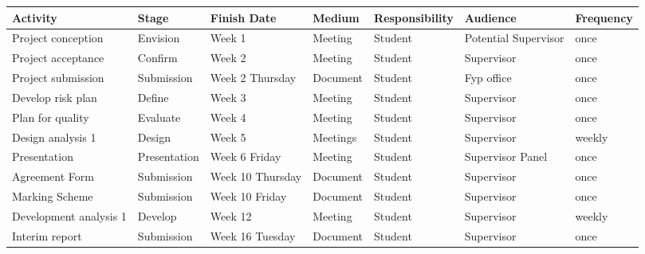 	\begin{center}
	
		\begin{tabular}{ | >{\scriptsize}p{35mm} | >{\scriptsize}p{15mm} | >{\scriptsize}p{25mm} | >{\scriptsize}p{15mm} | >{\scriptsize}p{25mm} | >{\scriptsize}p{15mm} | >{\scriptsize}p{15mm} |}
			\hline

			\textbf{Activity} 		& \textbf{Stage} 	& \textbf{Finish Date} 	& \textbf{Medium} 	& \textbf{Responsibility} 	& \textbf{Audience} 		& \textbf{Frequency} 	\\ \hline
			Project conception 		& Envision 			& Week 1 				& Meeting		 	& Student 					& Potential Supervisor	 	& once 					\\ \hline
			\rowcolor[gray]{.98}
			Project acceptance 		& Confirm 			& Week 2 				& Meeting 			& Student 					& Supervisor 				& once 					\\ \hline
			Project submission 		& Submission 		& Week 2 Thursday 		& Document 			& Student 					& Fyp office 				& once 					\\ \hline
			\rowcolor[gray]{.98}
			Develop risk plan 		& Define 			& Week 3 				& Meeting 			& Student 					& Supervisor 				& once 					\\ \hline
			Plan for quality 		& Evaluate 			& Week 4 				& Meeting 			& Student 					& Supervisor 				& once 					\\ \hline
			\rowcolor[gray]{.98}
			Design analysis 1 		& Design 			& Week 5 				& Meetings 			& Student 					& Supervisor 				& weekly 				\\ \hline
			Presentation 			& Presentation 		& Week 6 Friday			& Meeting 			& Student 					& Supervisor Panel 			& once 					\\ \hline
			\rowcolor[gray]{.98}
			Agreement Form 			& Submission 		& Week 10 Thursday		& Document 			& Student 					& Supervisor	 			& once 					\\ \hline
			Marking Scheme 			& Submission 		& Week 10 Friday 		& Document 			& Student 					& Supervisor	 			& once 					\\ \hline
			\rowcolor[gray]{.98}
			Development analysis 1 	& Develop 			& Week 12 				& Meeting 			& Student 					& Supervisor 				& weekly 				\\ \hline
			Interim report 			& Submission 		& Week 16 Tuesday		& Document 			& Student 					& Supervisor 				& once 					\\ \hline
	
		\end{tabular}
		
	\end{center}
		
